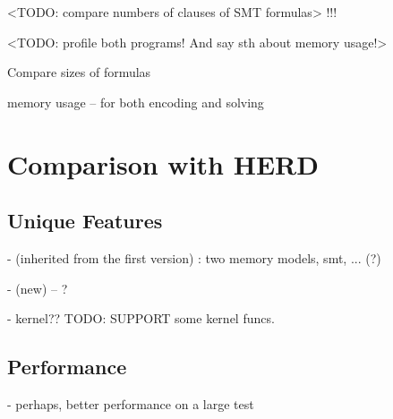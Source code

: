 <TODO: compare numbers of clauses of SMT formulas> !!!

<TODO: profile both programs! And say sth about memory usage!> 












Compare sizes of formulas


memory usage -- for both encoding and solving




\section{Comparison with HERD}

\subsection{Unique Features}

- (inherited from the first version) : two memory models, smt, ... (?)

- (new) -- ?

- kernel?? TODO: SUPPORT some kernel funcs.


\subsection{Performance}

- perhaps, better performance on a large test